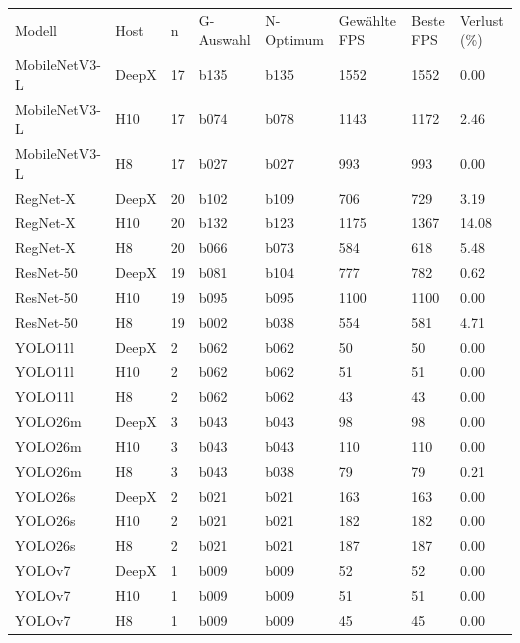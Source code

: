 \begin{tabular}{llllllll}
Modell & Host & n & G-Auswahl & N-Optimum & Gewählte FPS & Beste FPS & Verlust (\%) \\
MobileNetV3-L & DeepX & 17 & b135 & b135 & 1552 & 1552 & 0.00 \\
MobileNetV3-L & H10 & 17 & b074 & b078 & 1143 & 1172 & 2.46 \\
MobileNetV3-L & H8 & 17 & b027 & b027 & 993 & 993 & 0.00 \\
RegNet-X & DeepX & 20 & b102 & b109 & 706 & 729 & 3.19 \\
RegNet-X & H10 & 20 & b132 & b123 & 1175 & 1367 & 14.08 \\
RegNet-X & H8 & 20 & b066 & b073 & 584 & 618 & 5.48 \\
ResNet-50 & DeepX & 19 & b081 & b104 & 777 & 782 & 0.62 \\
ResNet-50 & H10 & 19 & b095 & b095 & 1100 & 1100 & 0.00 \\
ResNet-50 & H8 & 19 & b002 & b038 & 554 & 581 & 4.71 \\
YOLO11l & DeepX & 2 & b062 & b062 & 50 & 50 & 0.00 \\
YOLO11l & H10 & 2 & b062 & b062 & 51 & 51 & 0.00 \\
YOLO11l & H8 & 2 & b062 & b062 & 43 & 43 & 0.00 \\
YOLO26m & DeepX & 3 & b043 & b043 & 98 & 98 & 0.00 \\
YOLO26m & H10 & 3 & b043 & b043 & 110 & 110 & 0.00 \\
YOLO26m & H8 & 3 & b043 & b038 & 79 & 79 & 0.21 \\
YOLO26s & DeepX & 2 & b021 & b021 & 163 & 163 & 0.00 \\
YOLO26s & H10 & 2 & b021 & b021 & 182 & 182 & 0.00 \\
YOLO26s & H8 & 2 & b021 & b021 & 187 & 187 & 0.00 \\
YOLOv7 & DeepX & 1 & b009 & b009 & 52 & 52 & 0.00 \\
YOLOv7 & H10 & 1 & b009 & b009 & 51 & 51 & 0.00 \\
YOLOv7 & H8 & 1 & b009 & b009 & 45 & 45 & 0.00 \\
\end{tabular}
